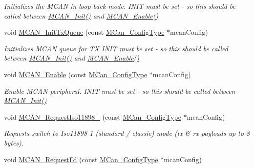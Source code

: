 \begin{DoxyCompactItemize}
\begin{DoxyCompactList}\small\item\em Initializes the M\+C\+AN in loop back mode. I\+N\+IT must be set -\/ so this should be called between \mbox{\hyperlink{group__can__module_ga9b35cd79fb5eeec8cf1ba7247b25a646}{M\+C\+A\+N\+\_\+\+Init()}} and \mbox{\hyperlink{group__can__module_ga712fa4d48e3fd1365a08a91cd3932104}{M\+C\+A\+N\+\_\+\+Enable()}} \end{DoxyCompactList}\item 
void \mbox{\hyperlink{group__can__module_gaf7258e6de240c101aa46f33a26c87615}{M\+C\+A\+N\+\_\+\+Init\+Tx\+Queue}} (const \mbox{\hyperlink{structMCan__ConfigTag}{M\+Can\+\_\+\+Config\+Type}} $\ast$mcan\+Config)
\begin{DoxyCompactList}\small\item\em Initializes M\+C\+AN queue for TX I\+N\+IT must be set -\/ so this should be called between \mbox{\hyperlink{group__can__module_ga9b35cd79fb5eeec8cf1ba7247b25a646}{M\+C\+A\+N\+\_\+\+Init()}} and \mbox{\hyperlink{group__can__module_ga712fa4d48e3fd1365a08a91cd3932104}{M\+C\+A\+N\+\_\+\+Enable()}} \end{DoxyCompactList}\item 
void \mbox{\hyperlink{group__can__module_ga712fa4d48e3fd1365a08a91cd3932104}{M\+C\+A\+N\+\_\+\+Enable}} (const \mbox{\hyperlink{structMCan__ConfigTag}{M\+Can\+\_\+\+Config\+Type}} $\ast$mcan\+Config)
\begin{DoxyCompactList}\small\item\em Enable M\+C\+AN peripheral. I\+N\+IT must be set -\/ so this should be called between \mbox{\hyperlink{group__can__module_ga9b35cd79fb5eeec8cf1ba7247b25a646}{M\+C\+A\+N\+\_\+\+Init()}} \end{DoxyCompactList}\item 
void \mbox{\hyperlink{group__can__module_gac2744eec323b9b5ba844c433362d0501}{M\+C\+A\+N\+\_\+\+Request\+Iso11898\+\_}} (const \mbox{\hyperlink{structMCan__ConfigTag}{M\+Can\+\_\+\+Config\+Type}} $\ast$mcan\+Config)
\begin{DoxyCompactList}\small\item\em Requests switch to Iso11898-\/1 (standard / classic) mode (tx \& rx payloads up to 8 bytes). \end{DoxyCompactList}\item 
void \mbox{\hyperlink{group__can__module_ga3cab9ee5985894d07f48d0d5edee6ab4}{M\+C\+A\+N\+\_\+\+Request\+Fd}} (const \mbox{\hyperlink{structMCan__ConfigTag}{M\+Can\+\_\+\+Config\+Type}} $\ast$mcan\+Config)

\end{DoxyCompactItemize}
